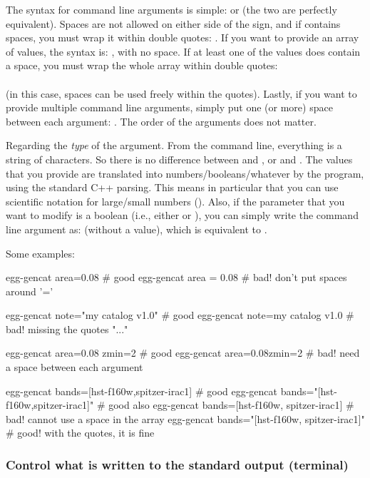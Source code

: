 The syntax for command line arguments is simple:  or  (the two are perfectly equivalent). Spaces are not allowed on either side of the \bashinline{=} sign, and if  contains spaces, you must wrap it within double quotes: . If you want to provide an array of values, the syntax is: , with no space. If at least one of the values does contain a space, you must wrap the whole array within double quotes: \\
\\
(in this case, spaces can be used freely within the quotes). Lastly, if you want to provide multiple command line arguments, simply put one (or more) space between each argument: . The order of the arguments does not matter.

Regarding the \emph{type} of the argument. From the command line, everything is a string of characters. So there is no difference between  and , or  and . The values that you provide are translated into numbers/booleans/whatever by the program, using the standard C++ parsing. This means in particular that you can use scientific notation for large/small numbers (). Also, if the parameter that you want to modify is a boolean (i.e., either  or ), you can simply write the command line argument as:  (without a value), which is equivalent to .

Some examples:
\begin{bashcode}
egg-gencat area=0.08        # good
egg-gencat area = 0.08      # bad! don't put spaces around '='

egg-gencat note="my catalog v1.0" # good
egg-gencat note=my catalog v1.0   # bad! missing the quotes "..."

egg-gencat area=0.08 zmin=2 # good
egg-gencat area=0.08zmin=2  # bad! need a space between each argument

egg-gencat bands=[hst-f160w,spitzer-irac1]    # good
egg-gencat bands="[hst-f160w,spitzer-irac1]"  # good also
egg-gencat bands=[hst-f160w, spitzer-irac1]   # bad! cannot use a space in the array
egg-gencat bands="[hst-f160w, spitzer-irac1]" # good! with the quotes, it is fine
\end{bashcode}


\subsubsection{Control what is written to the standard output (terminal)}

